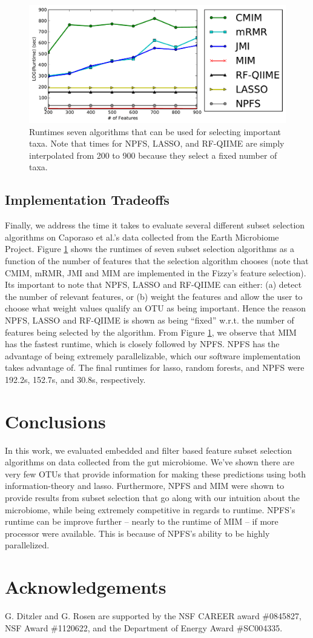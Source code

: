 \documentclass{acm_proc_article-sp}
\begin{document}
\begin{figure}
  \centering
  \includegraphics[width=.45\textwidth]{runtime.pdf}
  \caption{Runtimes seven algorithms that can be used for selecting important taxa. Note that times for NPFS, LASSO, and RF-QIIME are simply interpolated from 200 to 900 because they select a fixed number of taxa. }
  \label{fig:times}
\end{figure}



\subsection{Implementation Tradeoffs}

Finally, we address the time it takes to evaluate several different subset selection algorithms on Caporaso et al.'s data collected from the Earth Microbiome Project. Figure \ref{fig:times} shows the runtimes of seven subset selection algorithms as a function of the number of features that the selection algorithm chooses (note that CMIM, mRMR, JMI and MIM are implemented in the Fizzy's feature selection). Its important to note that NPFS, LASSO and RF-QIIME can either: (a) detect the number of relevant features, or (b) weight the features and allow the user to choose what weight values qualify an OTU as being important. Hence the reason NPFS, LASSO and RF-QIIME is shown as being ``fixed'' w.r.t. the number of features being selected by the algorithm.  From Figure \ref{fig:times}, we observe that MIM has the fastest runtime, which is closely followed by NPFS. NPFS has the advantage of being extremely parallelizable, which our software implementation takes advantage of. The final runtimes for lasso, random forests, and NPFS were 192.2s, 152.7s, and 30.8s, respectively. 


\section{Conclusions}
\label{sec:conc}

In this work, we evaluated embedded and filter based feature subset selection algorithms on data collected from the gut microbiome. We've shown there are very few OTUs that provide information for making these predictions using both information-theory and lasso. Furthermore, NPFS and MIM were shown to provide results from subset selection that go along with our intuition about the microbiome, while being extremely competitive in regards to runtime. NPFS's runtime can be improve further -- nearly to the runtime of MIM -- if more processor were available. This is because of NPFS's ability to be highly parallelized.  

\section{Acknowledgements}
G. Ditzler and G. Rosen are  supported by the NSF CAREER award \#0845827, NSF Award \#1120622, and the Department of Energy Award \#SC004335. 





\end{document}
